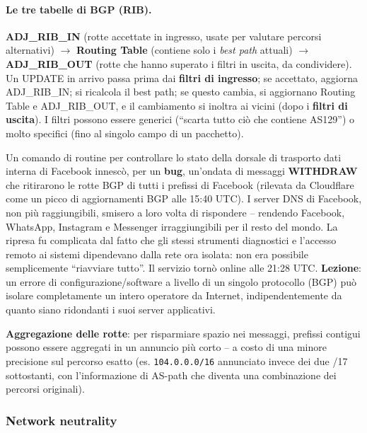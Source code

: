 \documentclass[12pt, a4paper]{article}
\begin{document}
\paragraph{Le tre tabelle di BGP (RIB).} \textbf{ADJ\_RIB\_IN} (rotte accettate in ingresso, usate per valutare percorsi alternativi) $\to$ \textbf{Routing Table} (contiene solo i \textit{best path} attuali) $\to$ \textbf{ADJ\_RIB\_OUT} (rotte che hanno superato i filtri in uscita, da condividere). Un UPDATE in arrivo passa prima dai \textbf{filtri di ingresso}; se accettato, aggiorna ADJ\_RIB\_IN; si ricalcola il best path; se questo cambia, si aggiornano Routing Table e ADJ\_RIB\_OUT, e il cambiamento si inoltra ai vicini (dopo i \textbf{filtri di uscita}). I filtri possono essere generici (``scarta tutto ciò che contiene AS129'') o molto specifici (fino al singolo campo di un pacchetto).

\begin{tcolorbox}[colback=lightergray!10, colframe=tocsec, title=\textbf{Caso di studio: il disservizio Facebook del 4 ottobre 2021}]
Un comando di routine per controllare lo stato della dorsale di trasporto dati interna di Facebook innescò, per un \textbf{bug}, un'ondata di messaggi \textbf{WITHDRAW} che ritirarono le rotte BGP di tutti i prefissi di Facebook (rilevata da Cloudflare come un picco di aggiornamenti BGP alle 15:40 UTC). I server DNS di Facebook, non più raggiungibili, smisero a loro volta di rispondere -- rendendo Facebook, WhatsApp, Instagram e Messenger irraggiungibili per il resto del mondo. La ripresa fu complicata dal fatto che gli stessi strumenti diagnostici e l'accesso remoto ai sistemi dipendevano dalla rete ora isolata: non era possibile semplicemente ``riavviare tutto''. Il servizio tornò online alle 21:28 UTC. \textbf{Lezione}: un errore di configurazione/software a livello di un singolo protocollo (BGP) può isolare completamente un intero operatore da Internet, indipendentemente da quanto siano ridondanti i suoi server applicativi.
\end{tcolorbox}

\textbf{Aggregazione delle rotte}: per risparmiare spazio nei messaggi, prefissi contigui possono essere aggregati in un annuncio più corto -- a costo di una minore precisione sul percorso esatto (es. \texttt{104.0.0.0/16} annunciato invece dei due /17 sottostanti, con l'informazione di AS-path che diventa una combinazione dei percorsi originali).

\subsubsection{Network neutrality}
\end{document}
